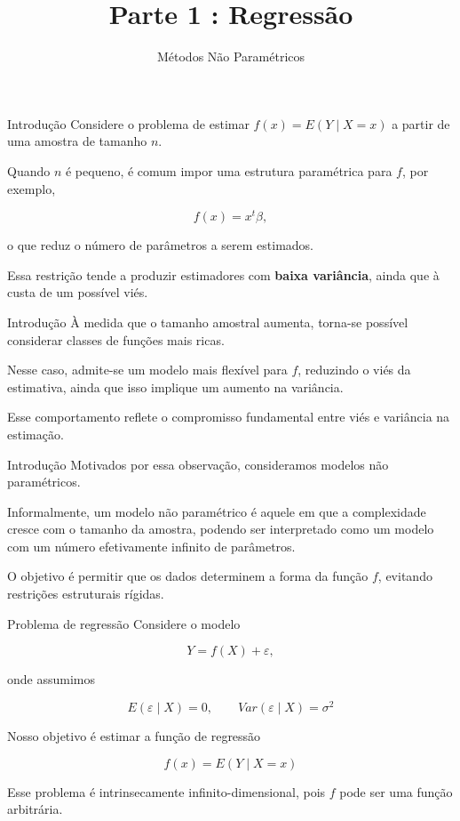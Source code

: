 \documentclass[
  ignorenonframetext,
  aspectratio=169,
]{beamer}
\title{Parte 1 : Regressão}
\subtitle{{Métodos Não Paramétricos}}
\author{}
\date{}
\begin{document}
\frame{\titlepage}


\begin{frame}{Introdução}
\label{introduuxe7uxe3o}
Considere o problema de estimar \(f(x) = E(Y \mid X = x)\) a partir de
uma amostra de tamanho \(n\).

Quando \(n\) é pequeno, é comum impor uma estrutura paramétrica para
\(f\), por exemplo,

\[
f(x) = x^t \beta,
\]

o que reduz o número de parâmetros a serem estimados.

Essa restrição tende a produzir estimadores com \textbf{baixa
variância}, ainda que à custa de um possível viés.
\end{frame}

\begin{frame}{Introdução}
\label{introduuxe7uxe3o-1}
À medida que o tamanho amostral aumenta, torna-se possível considerar
classes de funções mais ricas.

Nesse caso, admite-se um modelo mais flexível para \(f\), reduzindo o
viés da estimativa, ainda que isso implique um aumento na variância.

Esse comportamento reflete o compromisso fundamental entre viés e
variância na estimação.
\end{frame}

\begin{frame}{Introdução}
\label{introduuxe7uxe3o-2}
Motivados por essa observação, consideramos modelos não paramétricos.

Informalmente, um modelo não paramétrico é aquele em que a complexidade
cresce com o tamanho da amostra, podendo ser interpretado como um modelo
com um número efetivamente infinito de parâmetros.

O objetivo é permitir que os dados determinem a forma da função \(f\),
evitando restrições estruturais rígidas.
\end{frame}

\begin{frame}{Problema de regressão}
\label{problema-de-regressuxe3o}
Considere o modelo

\[
Y = f(X) + \varepsilon,
\]

onde assumimos

\[
E(\varepsilon \mid X) = 0, \qquad Var(\varepsilon \mid X) = \sigma^2
\]

Nosso objetivo é estimar a função de regressão

\[
f(x) = E(Y \mid X = x)
\]

Esse problema é intrinsecamente infinito-dimensional, pois \(f\) pode
ser uma função arbitrária.
\end{frame}
\end{document}
